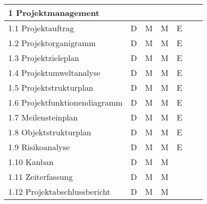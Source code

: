 \begin{longtable}{|l|c|c|c|c|c|c|}
  \multicolumn{7}{|l|}{1 Projektmanagement}                                                                                     \\ \hline
  1.1 Projektauftrag                     & D              & M           & M          & E        &               &               \\ \hline
  1.2 Projektorganigramm                 & D              & M           & M          & E        &               &               \\ \hline
  1.3 Projektzieleplan                   & D              & M           & M          & E        &               &               \\ \hline
  1.4 Projektumweltanalyse               & D              & M           & M          & E        &               &               \\ \hline
  1.5 Projektstrukturplan                & D              & M           & M          & E        &               &               \\ \hline
  1.6 Projektfunktionendiagramm          & D              & M           & M          & E        &               &               \\ \hline
  1.7 Meilensteinplan                    & D              & M           & M          & E        &               &               \\ \hline
  1.8 Objektstrukturplan                 & D              & M           & M          & E        &               &               \\ \hline
  1.9 Risikoanalyse                      & D              & M           & M          & E        &               &               \\ \hline
  1.10 Kanban                            & D              & M           & M          &          &               &               \\ \hline
  1.11 Zeiterfassung                     & D              & M           & M          &          &               &               \\ \hline
  1.12 Projektabschlussbericht           & D              & M           & M          &          &               &               \\ \hline


\end{longtable}
